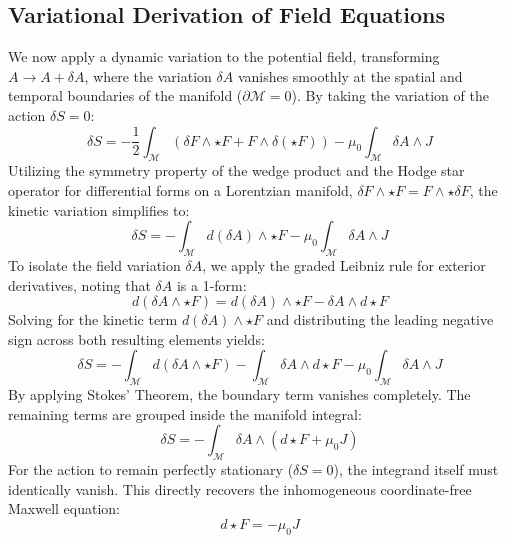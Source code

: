 \documentclass[11pt,a4paper]{article}
\begin{document}
\subsection*{Variational Derivation of Field Equations}
We now apply a dynamic variation to the potential field, transforming $A \to A + \delta A$, where the variation $\delta A$ vanishes smoothly at the spatial and temporal boundaries of the manifold ($\partial\mathcal{M} = 0$). By taking the variation of the action $\delta S = 0$:
\begin{equation}
\delta S = -\frac{1}{2} \int_{\mathcal{M}} \left( \delta F \wedge \star F + F \wedge \delta(\star F) \right) - \mu_0 \int_{\mathcal{M}} \delta A \wedge J
\end{equation}
Utilizing the symmetry property of the wedge product and the Hodge star operator for differential forms on a Lorentzian manifold, $\delta F \wedge \star F = F \wedge \star \delta F$, the kinetic variation simplifies to:
\begin{equation}
\delta S = - \int_{\mathcal{M}} d(\delta A) \wedge \star F - \mu_0 \int_{\mathcal{M}} \delta A \wedge J
\end{equation}
To isolate the field variation $\delta A$, we apply the graded Leibniz rule for exterior derivatives, noting that $\delta A$ is a 1-form:
\begin{equation}
d(\delta A \wedge \star F) = d(\delta A) \wedge \star F - \delta A \wedge d\star F
\end{equation}
Solving for the kinetic term $d(\delta A) \wedge \star F$ and distributing the leading negative sign across both resulting elements yields:
\begin{equation}
\delta S = - \int_{\mathcal{M}} d(\delta A \wedge \star F) - \int_{\mathcal{M}} \delta A \wedge d\star F - \mu_0 \int_{\mathcal{M}} \delta A \wedge J
\end{equation}
By applying Stokes' Theorem, the boundary term vanishes completely. The remaining terms are grouped inside the manifold integral:
\begin{equation}
\delta S = -\int_{\mathcal{M}} \delta A \wedge \left( d\star F + \mu_0 J \right)
\end{equation}
For the action to remain perfectly stationary ($\delta S = 0$), the integrand itself must identically vanish. This directly recovers the inhomogeneous coordinate-free Maxwell equation:
\begin{equation}
d\star F = -\mu_0 J
\end{equation}
\end{document}
